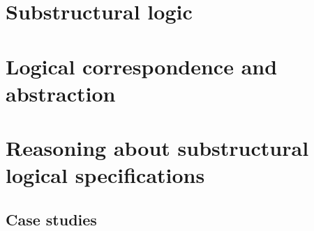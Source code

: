 \documentclass[12pt,openany]{cmuthesis}
\begin{document}


\part{Substructural logic}







\part{Logical correspondence and abstraction}







\part{Reasoning about substructural logical specifications}

\chapter{Case studies}




\end{document}

